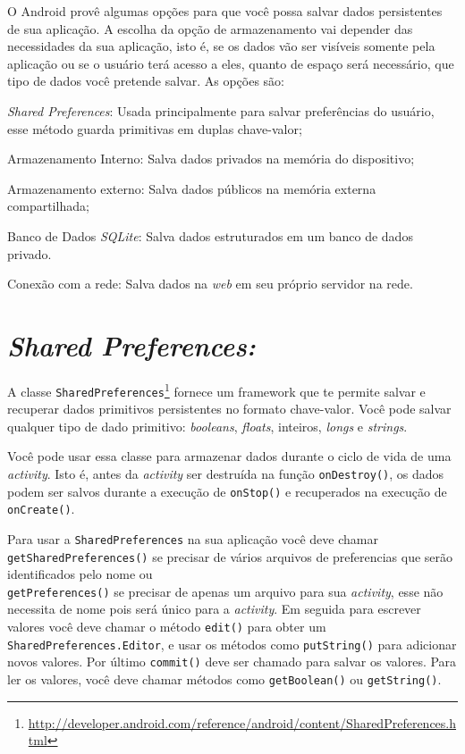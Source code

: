 \documentclass[a4paper,12pt,brazil,oneside]{book}
\begin{document}
\begin{singlespace}
	O Android provê algumas opções para que você possa salvar dados persistentes de sua aplicação. A escolha da opção de armazenamento vai depender das necessidades da sua aplicação, isto é, se os dados vão ser visíveis somente pela aplicação ou se o usuário terá acesso a eles, quanto de espaço será necessário, que tipo de dados você pretende salvar.
	As opções são: 
	\bi
		\item \emph{Shared Preferences}: Usada principalmente para salvar preferências do usuário, esse método guarda primitivas em duplas chave-valor;
		\item Armazenamento Interno: Salva dados privados na memória do dispositivo;
		\item Armazenamento externo: Salva dados públicos na memória externa compartilhada;
		\item Banco de Dados \emph{SQLite}: Salva dados estruturados em um banco de dados privado.
		\item Conexão com a rede: Salva dados na \emph{web} em seu próprio servidor na rede.
	\ei
			
	\section{\emph{Shared Preferences:}}
		
		A classe \texttt{SharedPreferences}\footnote{\href{http://developer.android.com/reference/android/content/SharedPreferences.html}{http://developer.android.com/reference/android/content/SharedPreferences.html}} fornece um framework que te permite salvar e recuperar dados primitivos persistentes no formato chave-valor. Você pode salvar qualquer tipo de dado primitivo: \emph{booleans}, \emph{floats}, inteiros, \emph{longs} e \emph{strings}.
 
		Você pode usar essa classe para armazenar dados durante o ciclo de vida de uma \emph{activity}. Isto é, antes da \emph{activity} ser destruída na função \texttt{onDestroy()}, os dados podem ser salvos durante a execução de \texttt{onStop()} e recuperados na execução de \texttt{onCreate()}.

		Para usar a \texttt{SharedPreferences} na sua aplicação você deve chamar \\ \texttt{getSharedPreferences()} se precisar de vários arquivos de preferencias que serão identificados pelo nome ou \\ \texttt{getPreferences()} se precisar de apenas um arquivo para sua \emph{activity}, esse não necessita de nome pois será único para a \emph{activity}. Em seguida para escrever valores você deve chamar o método \texttt{edit()} para obter um \texttt{SharedPreferences.Editor}, e usar os métodos como \texttt{putString()} para adicionar novos valores. Por último \texttt{commit()} deve ser chamado para salvar os valores. Para ler os valores, você deve chamar métodos como \texttt{getBoolean()} ou \texttt{getString()}.


\end{singlespace}
\end{document}

